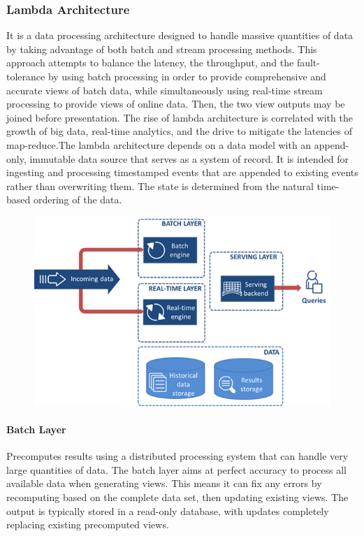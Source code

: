 \subsubsection{Lambda Architecture}
\label{subsec:subsec01}
It is a data processing architecture designed to handle massive quantities of data by taking advantage of both
 batch and stream processing methods. This approach attempts to balance the latency, the throughput,
  and the fault-tolerance by using batch processing in order to provide comprehensive and accurate views of batch data,
   while simultaneously using real-time stream processing to provide views of online data. 
   Then, the two view outputs may be joined before presentation. 
   The rise of lambda architecture is correlated with the growth of big data, 
   real-time analytics, and the drive to mitigate the latencies of map-reduce.The lambda architecture depends on a data model with an append-only, 
immutable data source that serves as a system of record. 
It is intended for ingesting and processing timestamped events that are appended to existing events 
rather than overwriting them. The state is determined from the natural time-based ordering of the data.
\begin{figure}[h!]
	\centering
	\includegraphics[height=0.3\textheight]{fig01/lambda}
	\label{fig:FilialesEtClients}
\end{figure}
\paragraph{Batch Layer}
\label{subsec:subsec01}
Precomputes results using a distributed processing system that can handle very large quantities of data. 
The batch layer aims at perfect accuracy to process all available data when generating views. 
This means it can fix any errors by recomputing based on the complete data set, then updating existing views. 
The output is typically stored in a read-only database, with updates completely replacing existing precomputed views.
